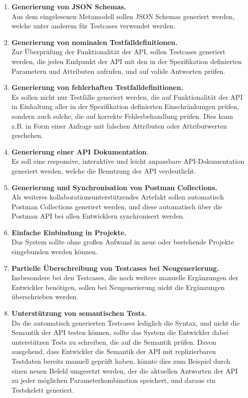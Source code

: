 \begin{enumerate}
	\item \textbf{Generierung von JSON Schemas.} \\
	Aus dem eingelesenen Metamodell sollen JSON Schemas generiert werden, welche unter anderem für Testcases verwendet werden.
	\item \textbf{Generierung von nominalen Testfalldefinitionen.} \\
	Zur Überprüfung der Funktionalität der API, sollen Testcases generiert werden, die jeden Endpunkt der API mit den in der Spezifikation definierten Parametern und Attributen aufrufen, und auf valide Antworten prüfen.
	\item \textbf{Generierung von fehlerhaften Testfalldefinitionen.} \\
	Es sollen nicht nur Testfälle generiert werden, die auf Funktionalität der API in Einhaltung aller in der Spezifikation definierten Einschränkungen prüfen, sondern auch solche, die auf korrekte Fehlerbehandlung prüfen. Dies kann z.B. in Form einer Anfrage mit falschen Attributen oder Attributwerten geschehen.
	\item \textbf{Generierung einer API Dokumentation}. \\
	Es soll eine responsive, interaktive und leicht anpassbare API-Dokumentation generiert werden, welche die Benutzung der API verdeutlicht.
	\item \textbf{Generierung und Synchronisation von Postman Collections.} \\
	Als weiteres kollaborationsunterstützendes Artefakt sollen automatisch Postman Collections generiert werden, und diese automatisch über die Postman API bei allen Entwicklern synchronisert werden.
	\item \textbf{Einfache Einbindung in Projekte.} \\
	Das System sollte ohne großen Aufwand in neue oder bestehende Projekte eingebunden werden können.  
	\item \textbf{Partielle Überschreibung von Testcases bei Neugenerierung. } \\
	Insbesondere bei den Testcases, die noch weitere manuelle Ergänzungen der Entwickler benötigen, sollen bei Neugenerierung nicht die Ergänzungen überschrieben werden.
	\item \textbf{Unterstützung von semantischen Tests.} \\
	Da die automatisch generierten Testcases lediglich die Syntax, und nicht die Semantik der API testen können, sollte das System die Entwickler dabei unterstützen Tests zu schreiben, die auf die Semantik prüfen. Davon ausgehend, dass Entwickler die Semantik der API mit replizierbaren Testdaten bereits manuell geprüft haben, könnte dies zum Beispiel durch einen neuen Befehl umgesetzt werden, der die aktuellen Antworten der API zu jeder möglichen Parameterkombination speichert, und daraus ein Testskelett generiert.
\end{enumerate}

